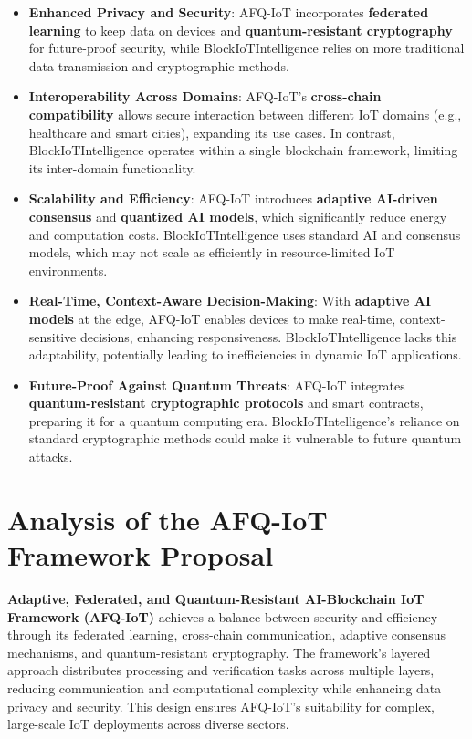 \documentclass[12pt, oneside]{report}
\begin{document}
\begin{itemize}
    \item \textbf{Enhanced Privacy and Security}: AFQ-IoT incorporates \textbf{federated learning} to keep data on devices and \textbf{quantum-resistant cryptography} for future-proof security, while BlockIoTIntelligence relies on more traditional data transmission and cryptographic methods.
    
    \item \textbf{Interoperability Across Domains}: AFQ-IoT’s \textbf{cross-chain compatibility} allows secure interaction between different IoT domains (e.g., healthcare and smart cities), expanding its use cases. In contrast, BlockIoTIntelligence operates within a single blockchain framework, limiting its inter-domain functionality.
    
    \item \textbf{Scalability and Efficiency}: AFQ-IoT introduces \textbf{adaptive AI-driven consensus} and \textbf{quantized AI models}, which significantly reduce energy and computation costs. BlockIoTIntelligence uses standard AI and consensus models, which may not scale as efficiently in resource-limited IoT environments.
    
    \item \textbf{Real-Time, Context-Aware Decision-Making}: With \textbf{adaptive AI models} at the edge, AFQ-IoT enables devices to make real-time, context-sensitive decisions, enhancing responsiveness. BlockIoTIntelligence lacks this adaptability, potentially leading to inefficiencies in dynamic IoT applications.
    
    \item \textbf{Future-Proof Against Quantum Threats}: AFQ-IoT integrates \textbf{quantum-resistant cryptographic protocols} and smart contracts, preparing it for a quantum computing era. BlockIoTIntelligence’s reliance on standard cryptographic methods could make it vulnerable to future quantum attacks.
\end{itemize}



\chapter{Analysis of the AFQ-IoT Framework Proposal}
\textbf{Adaptive, Federated, and Quantum-Resistant AI-Blockchain IoT Framework (AFQ-IoT)} achieves a balance between security and efficiency through its federated learning, cross-chain communication, adaptive consensus mechanisms, and quantum-resistant cryptography. The framework's layered approach distributes processing and verification tasks across multiple layers, reducing communication and computational complexity while enhancing data privacy and security. This design ensures AFQ-IoT’s suitability for complex, large-scale IoT deployments across diverse sectors.
\end{document}
